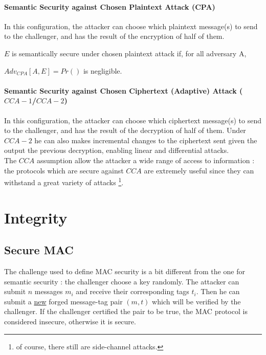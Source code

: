 \paragraph{Semantic Security against Chosen Plaintext Attack (CPA)\\}

In this configuration, the attacker can choose which plaintext message(s) to send to the challenger, and has the result of the encryption of half of them. 

\begin{mytheorem}
$E$ is semantically secure  under chosen plaintext attack if, for all adversary A,
     
\flushright	  $Adv_{CPA}[A,E] = Pr()$ is negligible.
\end{mytheorem}

\paragraph{Semantic Security against Chosen Ciphertext (Adaptive) Attack ($CCA-1$/$CCA-2$)\\}

In this configuration, the attacker can choose which ciphertext message(s) to send to the challenger, and has the result of the decryption of half of them. Under $CCA-2$ he can also makes incremental changes to the ciphertext sent given the output the previous decryption, enabling linear and differential attacks. \\
The $CCA$ assumption allow the attacker a wide range of access to information : the protocols which are secure against $CCA$ are extremely useful since they can withstand a great variety of attacks \footnote{of course, there still are side-channel attacks.}.

\section{Integrity}

\subsection{Secure MAC}

The challenge used to define MAC security is a bit different from the one for semantic security : the challenger choose a key randomly. The attacker can submit $n$ messages $m_i$ and receive their corresponding tags $t_i$. Then he can submit a \underline{new} forged message-tag pair $(m,t)$ which will be verified by the challenger. If the challenger certified the pair to be true, the MAC protocol is considered insecure, otherwise it is secure.


